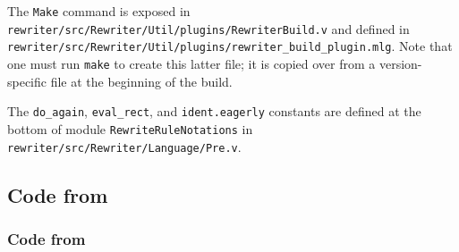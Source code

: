 \documentclass[a4paper,USenglish,cleveref,autoref,thm-restate]{lipics-v2021}
\begin{document}
\begin{minipage}[t][1cm]{\textwidth}
The \texttt{Make} command is exposed in \texttt{rewriter/src/Rewriter/Util/plugins/RewriterBuild.v} and defined in \texttt{rewriter/src/Rewriter/Util/plugins/rewriter\_build\_plugin.mlg}.
Note that one must run \texttt{make} to create this latter file; it is copied over from a version-specific file at the beginning of the build.

\label{sec:code:eval-rect}%
\label{sec:code:ident.eagerly}%
The \verb|do_again|, \verb|eval_rect|, and \verb|ident.eagerly| constants are defined at the bottom of module \verb|RewriteRuleNotations| in \texttt{rewriter/src/Rewriter/Language/Pre.v}.

\subsection{Code from }


\subsubsection{Code from }\label{sec:code:nine-steps}


\end{minipage}
\end{document}
